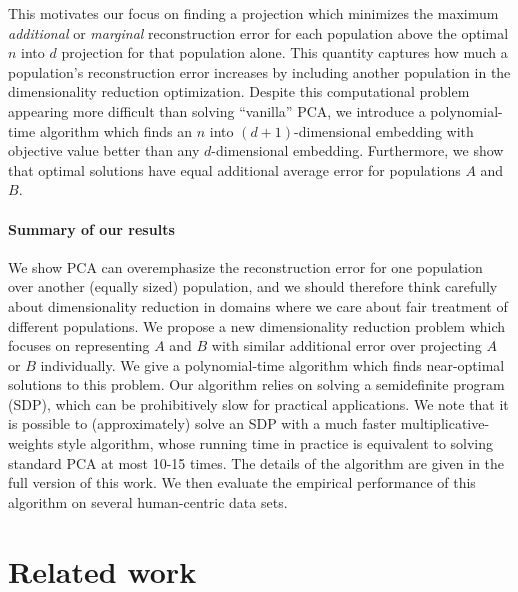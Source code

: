 \documentclass{article}
\begin{document}
This motivates our focus on finding a projection which minimizes the
maximum \emph{additional} or \emph{marginal} reconstruction error for each population
above the optimal $n$ into $d$ projection for that population
alone. This quantity captures how much a population's reconstruction
error increases by including another population in the dimensionality
reduction optimization.  
Despite this computational problem appearing
more difficult than solving ``vanilla'' PCA, we introduce a
polynomial-time algorithm which finds an $n$ into $(d+1)$-dimensional
embedding with objective value better than any $d$-dimensional
embedding. 
Furthermore, we show that optimal solutions have equal additional
average error for populations $A$ and $B$.



\paragraph{Summary of our results}

We show PCA can overemphasize the reconstruction error for
one population over another (equally sized) population, and we should
therefore think carefully about dimensionality reduction in
domains where we care about fair treatment of different
populations. We propose a new dimensionality reduction problem which
focuses on representing $A$ and $B$ with similar additional
error over projecting $A$ or $B$ individually. We give a
polynomial-time algorithm which finds 
near-optimal solutions to this
problem. Our  algorithm relies on solving a semidefinite program (SDP),
which can be prohibitively slow for practical applications. We note 
that 
it
is possible to (approximately) solve an SDP with a much faster
multiplicative-weights style algorithm, whose running time in practice
is equivalent to solving standard PCA at most 10-15 times. The details
of the algorithm are given in the full version of this work. We then
evaluate the empirical performance of this algorithm on several
human-centric data sets.


\section{Related work}\label{sec:rw}
\end{document}
